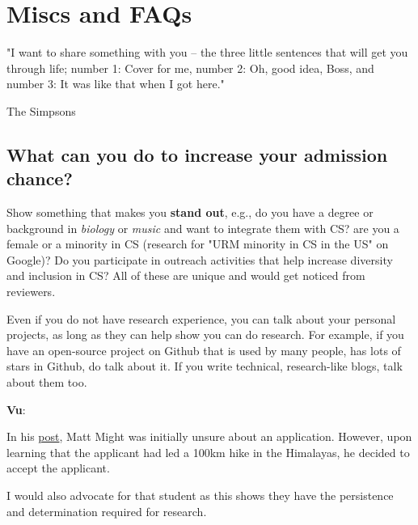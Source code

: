 \documentclass[11pt]{article}
\newenvironment{commentbox}[1][]{
\small
    \begin{cbox}
    \textbf{#1}: 
 }{
   \end{cbox}
}
\begin{document}
\section{Miscs and FAQs}
\epigraph{"I want to share something with you – the three little sentences that will get you through life; number 1: Cover for me, number 2: Oh, good idea, Boss, and number 3: It was like that when I got here."}{The Simpsons}

\subsection{What can you do to increase your admission chance?}\label{sec:improve-your-chance}

 Show something that makes you \textbf{stand out}, e.g., do you have a degree or background in \emph{biology} or \emph{music} and want to integrate them with CS? are you a female or a minority in CS (research for "URM minority in CS in the US" on Google)? Do you participate in outreach activities that help increase diversity and inclusion in CS? All of these are unique and would get noticed from reviewers. 
    
Even if you do not have research experience, you can talk about your personal projects, as long as they can help show you can do research. For example, if you have an open-source project on Github that is used by many people, has lots of stars in Github, do talk about it. If you write technical, research-like blogs, talk about them too.

\begin{commentbox}[Vu]
In his \href{https://matt.might.net/articles/how-to-apply-and-get-in-to-graduate-school-in-science-mathematics-engineering-or-computer-science/}{post}, Matt Might was initially unsure about an application. However, upon learning that the applicant had led a 100km hike in the Himalayas, he decided to accept the applicant.

\tcblower
I would also advocate for that student as this shows they have the persistence and determination required for research.
\end{commentbox}

\end{document}
